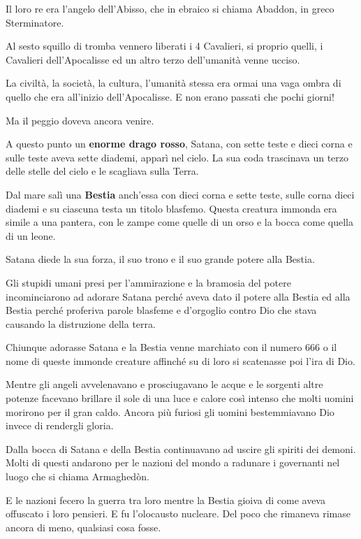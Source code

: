 \documentclass[12pt,a4paper,twoside,openany]{book}
\begin{document}
\begin{multicols}{2}
Il loro re era l’angelo dell’Abisso, che in ebraico si chiama Abaddon, in greco Sterminatore.

Al sesto squillo di tromba vennero liberati i 4 Cavalieri, si proprio quelli, i Cavalieri dell'Apocalisse ed un altro terzo dell'umanità venne ucciso.

La civiltà, la società, la cultura, l'umanità stessa era ormai una vaga ombra di quello che era all'inizio dell'Apocalisse. E non erano passati che pochi giorni!

Ma il peggio doveva ancora venire.

A questo punto un \textbf{enorme drago rosso}, Satana, con sette teste e dieci corna e sulle teste aveva sette diademi, apparì nel cielo. La sua coda trascinava un terzo delle stelle del cielo e le scagliava sulla Terra. 

Dal mare salì una \textbf{Bestia} anch'essa con dieci corna e sette teste, sulle corna dieci diademi e su ciascuna testa un titolo blasfemo. Questa creatura immonda era simile a una pantera, con le zampe come quelle di un orso e la bocca come quella di un leone. 

Satana diede la sua forza, il suo trono e il suo grande potere alla Bestia. 

Gli stupidi umani presi per l'ammirazione e la bramosia del potere incominciarono ad adorare Satana perché aveva dato il potere alla Bestia ed alla Bestia perché proferiva parole blasfeme e d'orgoglio contro Dio che stava causando la distruzione della terra.

Chiunque adorasse Satana e la Bestia venne marchiato con il numero 666 o il nome di queste immonde creature affinché su di loro si scatenasse poi l'ira di Dio.

Mentre gli angeli avvelenavano e prosciugavano le acque e le sorgenti altre potenze facevano brillare il sole di una luce e calore così intenso che molti uomini morirono per il gran caldo. Ancora più furiosi gli uomini bestemmiavano Dio invece di rendergli gloria.

Dalla bocca di Satana e della Bestia continuavano ad uscire gli spiriti dei demoni. Molti di questi andarono per le nazioni del mondo a radunare i governanti nel luogo che si chiama Armaghedòn.

E le nazioni fecero la guerra tra loro mentre la Bestia gioiva di come aveva offuscato i loro pensieri. E fu l'olocausto nucleare. Del poco che rimaneva rimase ancora di meno, qualsiasi cosa fosse.


\end{multicols}
\end{document}
